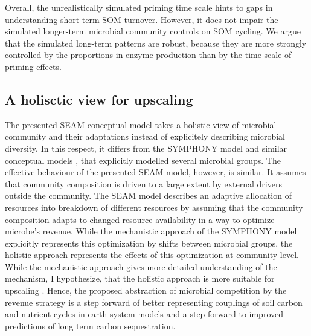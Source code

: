 Overall, the unrealistically simulated priming time scale hints to gaps in
understanding short-term SOM turnover. However, it does not impair the simulated
longer-term microbial community controls on SOM cycling. We argue that the
simulated long-term patterns are robust, because they are more strongly
controlled by the proportions in enzyme production than by the time scale of
priming effects.

\subsection{A holisctic view for upscaling}
\label{sec:Holistic}

The presented SEAM conceptual model takes a holistic view \citep{Panikov10} of
microbial community and their adaptations instead of explicitely describing
microbial diversity.
In this respect, it differs from the SYMPHONY model \citep{Perveen14} and
similar conceptual models \citep{Fontaine03}, that explicitly modelled several
microbial groups.
The effective behaviour of the presented SEAM model, however, is similar.
It assumes that community composition is driven to a large extent by external
drivers outside the community. The SEAM model describes an adaptive allocation
of resources into breakdown of different resources by assuming that the
community composition adapts to changed resource availability in a way to
optimize microbe's revenue.
While the mechanistic approach of the SYMPHONY model explicitly represents this
optimization by shifts between microbial groups, the holistic approach
represents the effects of this optimization at community level.
While the mechanistic approach gives more detailed understanding of the mechanism,
I hypothesize, that the holistic approach is more suitable for upscaling
\citep{Wutzler13}.
Hence, the proposed abstraction of microbial competition by the revenue strategy
is a step forward of better representing couplings of soil carbon and nutrient
cycles in earth system models and a step forward to improved predictions of long
term carbon sequestration.

